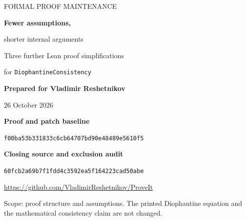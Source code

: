 \documentclass[11pt,letterpaper]{article}
\newcommand{\code}[1]{{\small\urlstyle{tt}\nolinkurl{#1}}}
\newcommand{\pin}{\code{f00ba53b331833c6cb64707bd90e48489e5610f5}}
\newcommand{\repo}{\url{https://github.com/VladimirReshetnikov/ProveIt}}
\begin{document}
\hypersetup{pageanchor=false}
\begin{titlepage}
\vspace*{0.5in}
{\Large\color{accent}FORMAL PROOF MAINTENANCE\par}
\vspace{0.22in}
{\huge\bfseries\color{ink}Fewer assumptions,\par shorter internal arguments\par}
\vspace{0.22in}
{\Large Three further Lean proof simplifications\par}
{\large for \texttt{DiophantineConsistency}\par}
\vspace{0.35in}
\textbf{Prepared for Vladimir Reshetnikov}\par
26 October 2026\par
\vspace{0.25in}
\textbf{Proof and patch baseline}\par
\pin\par
\textbf{Closing source and exclusion audit}\par
\code{60fcb2a69b7f1fdd4c3592ea5f164223cad50abe}\par
\repo
\vspace{0.35in}
\begin{abstract}
This report treats all recommendations in the forty-three prior simplification packets at the closing audit as already available, including optional and unimplemented recommendations. Three residual opportunities survive the resulting nonduplication screen. First, the positive source equations themselves imply the first port's positivity and a stronger scale bound, so callers need not pass that positivity guard independently. Second, exact binary rotation depends only on a partial-bit phase and a cyclic whole-digit displacement; comparing these parameters removes Boolean hypotheses from a recently added rephasing proof. Third, internal Euclidean-division uniqueness can use separation of quotient intervals, avoiding the construction of a second successor-gap witness.

The accompanying Lean kernels, concrete source-row client, candidate patches, source manifests, and compiler records make these proposals reviewable. The report distinguishes checked lemmas from candidate integration and does not present isolated checks as a complete repository build. Two proposals strengthen interfaces; the division proposal mainly simplifies the mathematical argument. No aggregate line-reduction claim is made against an imaginary checkout containing every earlier proposal.
\end{abstract}
\vfill
{\small\color{ink}Scope: proof structure and assumptions. The printed Diophantine equation and the mathematical consistency claim are not changed.}
\end{titlepage}
\hypersetup{pageanchor=true}
\begingroup\small\setlength{\parskip}{0pt}
\tableofcontents
\endgroup
\clearpage
{}
\end{document}
